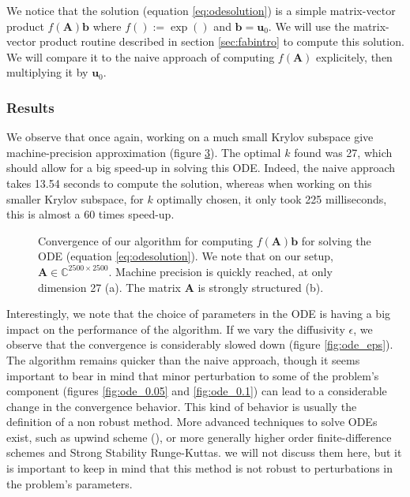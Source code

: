 \documentclass[11pt]{article}
\numberwithin{equation}{section}
\begin{document}
We notice that the solution (equation \ref{eq:odesolution}) is a simple matrix-vector product $f(\mathbf{A})\mathbf{b}$ where $f() := \exp()$ and $\mathbf{b} = \mathbf{u}_0$. We will use the matrix-vector product routine described in section \ref{sec:fabintro} to compute this solution. We will compare it to the naive approach of computing $f(\mathbf{A})$ explicitely, then multiplying it by $\mathbf{u}_0$.
\subsubsection{Results}

We observe that once again, working on a much small Krylov subspace give machine-precision approximation (figure \ref{fig:ode_comp}). The optimal $k$ found was 27, which should allow for a big speed-up in solving this ODE. Indeed, the naive approach takes 13.54 seconds to compute the solution, whereas when working on this smaller Krylov subspace, for $k$ optimally chosen, it only took 225 milliseconds, this is almost a 60 times speed-up.

\begin{figure}
    \begin{subfigure}[b]{.45\linewidth}
        
        \caption{}
        \label{fig:ode_conv}
    \end{subfigure}\hspace{.05\linewidth}
    \begin{subfigure}[b]{.45\linewidth}
        
        \caption{}
        \label{fig:ose_sparse}
    \end{subfigure}
    \caption{Convergence of our algorithm for computing $f(\mathbf{A})\mathbf{b}$ for solving the ODE (equation \ref{eq:odesolution}). We note that on our setup, $\mathbf{A}\in\mathbb{C}^{2500\times 2500}$. Machine precision is quickly reached, at only dimension 27 (a). The matrix $\mathbf{A}$ is strongly structured (b).}
    \label{fig:ode_comp}
\end{figure}

Interestingly, we note that the choice of parameters in the ODE is having a big impact on the performance of the algorithm. If we vary the diffusivity $\epsilon$, we observe that the convergence is considerably slowed down (figure \ref{fig:ode_eps}). The algorithm remains quicker than the naive approach, though it seems important to bear in mind that minor perturbation to some of the problem's component (figures \ref{fig:ode_0.05} and \ref{fig:ode_0.1}) can lead to a considerable change in the convergence behavior. This kind of behavior is usually the definition of a non robust method. More advanced techniques to solve ODEs exist, such as upwind scheme (\cite{lewis2004fundamentals}), or more generally higher order finite-difference schemes and Strong Stability Runge-Kuttas. we will not discuss them here, but it is important to keep in mind that this method is not robust to perturbations in the problem's parameters.
\end{document}
